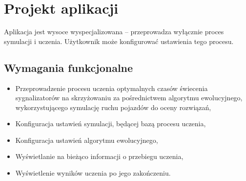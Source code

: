 \chapter*{Projekt aplikacji}
Aplikacja jest wysoce wyspecjalizowana -- przeprowadza wyłącznie proces symulacji i uczenia. Użytkownik może konfigurować ustawienia tego procesu.
\section*{Wymagania funkcjonalne}
\begin{itemize}
	\item Przeprowadzenie procesu uczenia optymalnych czasów świecenia sygnalizatorów na skrzyżowaniu za pośrednictwem algorytmu ewolucyjnego, wykorzystującego symulację ruchu pojazdów do oceny rozwiązań, 
	\item Konfiguracja ustawień symulacji, będącej bazą procesu uczenia,
	\item Konfiguracja ustawień algorytmu ewolucyjnego,
	\item Wyświetlanie na bieżąco informacji o przebiegu uczenia,
	\item Wyświetlenie wyników uczenia po jego zakończeniu.
\end{itemize}
